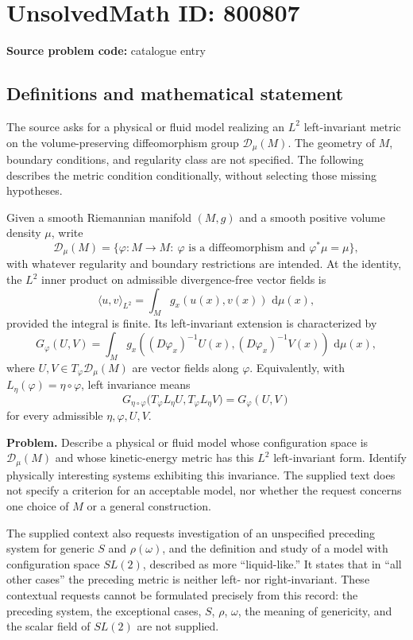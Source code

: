 \documentclass[11pt]{article}
\newcommand{\dd}{\,\mathrm{d}}
\begin{document}
\section*{UnsolvedMath ID: 800807}
\textbf{Source problem code:} catalogue entry
\subsection{Definitions and mathematical statement}
The source asks for a physical or fluid model realizing an \(L^2\) left-invariant metric on the volume-preserving diffeomorphism group \(\mathscr{D}_\mu(M)\). The geometry of \(M\), boundary conditions, and regularity class are not specified. The following describes the metric condition conditionally, without selecting those missing hypotheses.

Given a smooth Riemannian manifold \((M,g)\) and a smooth positive volume density \(\mu\), write
\[
\mathscr{D}_\mu(M)=\{\varphi:M\to M:\ \varphi\text{ is a diffeomorphism and }\varphi^*\mu=\mu\},
\]
with whatever regularity and boundary restrictions are intended. At the identity, the \(L^2\) inner product on admissible divergence-free vector fields is
\[
\langle u,v\rangle_{L^2}=\int_M g_x(u(x),v(x))\,\dd\mu(x),
\]
provided the integral is finite. Its left-invariant extension is characterized by
\[
G_\varphi(U,V)=\int_M g_x\!\left((D\varphi_x)^{-1}U(x),(D\varphi_x)^{-1}V(x)\right)\,\dd\mu(x),
\]
where \(U,V\in T_\varphi\mathscr{D}_\mu(M)\) are vector fields along \(\varphi\). Equivalently, with \(L_\eta(\varphi)=\eta\circ\varphi\), left invariance means
\[
G_{\eta\circ\varphi}\bigl(T_\varphi L_\eta U,T_\varphi L_\eta V\bigr)=G_\varphi(U,V)
\]
for every admissible \(\eta,\varphi,U,V\).

\textbf{Problem.} Describe a physical or fluid model whose configuration space is \(\mathscr{D}_\mu(M)\) and whose kinetic-energy metric has this \(L^2\) left-invariant form. Identify physically interesting systems exhibiting this invariance. The supplied text does not specify a criterion for an acceptable model, nor whether the request concerns one choice of \(M\) or a general construction.

The supplied context also requests investigation of an unspecified preceding system for generic \(S\) and \(\rho(\omega)\), and the definition and study of a model with configuration space \(SL(2)\), described as more ``liquid-like.'' It states that in ``all other cases'' the preceding metric is neither left- nor right-invariant. These contextual requests cannot be formulated precisely from this record: the preceding system, the exceptional cases, \(S\), \(\rho\), \(\omega\), the meaning of genericity, and the scalar field of \(SL(2)\) are not supplied.
\end{document}
